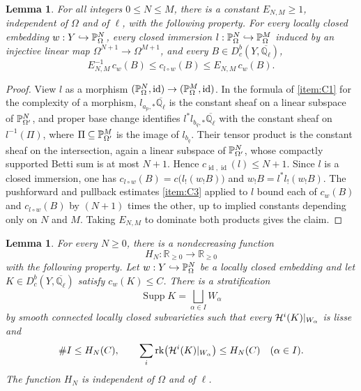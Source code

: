\documentclass[12pt,reqno]{amsart}
\theoremstyle{definition}
\theoremstyle{plain}
\newtheorem{lem}[para]{Lemma}
\theoremstyle{definition}
\theoremstyle{remark}
\newcommand{\bbQ}{\mathbb{Q}}  \newcommand{\bbR}{\mathbb{R}}
\newcommand{\ol}[1]{\overline{#1}}
\newcommand{\Ql}{\bbQ_{\ell}}
\newcommand{\Db}{D^b_c}
\newcommand{\Supp}{\operatorname{Supp}}
\begin{document}
\begin{lem}
\label{lem:linear-reembedding}
For all integers \(0\le N\le M\), there is a constant \(E_{N,M}\ge1\), independent of \(\Omega\) and of
\(\ell\), with the following property.  For every locally closed embedding
\(w:Y\hookrightarrow\mathbb{P}^N_\Omega\), every closed immersion
\(l:\mathbb{P}^N_\Omega\hookrightarrow\mathbb{P}^M_\Omega\) induced by an injective linear map
\(\Omega^{N+1}\to\Omega^{M+1}\), and every \(B\in\Db(Y,\ol\Ql)\),
\[
        E_{N,M}^{-1}\,c_w(B)\le c_{l\circ w}(B)\le E_{N,M}\,c_w(B).
\]
\end{lem}

\begin{proof}
View \(l\) as a morphism \((\mathbb{P}^N_\Omega,\operatorname{id})\to(\mathbb{P}^M_\Omega,\operatorname{id})\).  In the
formula of \ref{item:C1} for the complexity of a morphism, \(l_{a_p,*}\ol\Ql\) is the constant sheaf
on a linear subspace of \(\mathbb{P}^N_{\Omega'}\), and proper base change identifies \(l^*l_{b_q,*}\ol\Ql\)
with the constant sheaf on \(l^{-1}(\Pi)\), where \(\Pi\subseteq\mathbb{P}^M_{\Omega'}\) is the image of
\(l_{b_q}\).  Their tensor product is the constant sheaf on the intersection, again a linear subspace
of \(\mathbb{P}^N_{\Omega'}\), whose compactly supported Betti sum is at most \(N+1\).  Hence
\(c_{\operatorname{id},\operatorname{id}}(l)\le N+1\).  Since \(l\) is a closed immersion, one has
\(c_{l\circ w}(B)=c\bigl(l_!(w_!B)\bigr)\) and \(w_!B=l^*l_!(w_!B)\).  The pushforward and pullback
estimates \ref{item:C3} applied to \(l\) bound each of \(c_w(B)\) and \(c_{l\circ w}(B)\) by
\((N+1)\) times the other, up to implied constants depending only on \(N\) and \(M\).  Taking
\(E_{N,M}\) to dominate both products gives the claim.
\end{proof}

\begin{lem}
\label{lem:lissity-complexity}
For every \(N\ge0\), there is a nondecreasing function
\[
        H_N:\mathbb R_{\ge0}\longrightarrow\mathbb R_{\ge0}
\]
with the following property.  Let \(w:Y\hookrightarrow\mathbb{P}^N_\Omega\) be a locally closed embedding and
let \(K\in\Db(Y,\ol\Ql)\) satisfy \(c_w(K)\le C\).  There is a stratification
\[
        \Supp K=\bigsqcup_{\alpha\in I}W_\alpha
\]
by smooth connected locally closed subvarieties such that every \(\mathcal{H}^i(K)|_{W_\alpha}\) is lisse and
\[
        \#I\le H_N(C),
        \qquad
        \sum_i\operatorname{rk}\bigl(\mathcal{H}^i(K)|_{W_\alpha}\bigr)\le H_N(C)
        \quad(\alpha\in I).
\]
The function \(H_N\) is independent of \(\Omega\) and of \(\ell\).
\end{lem}
\end{document}
